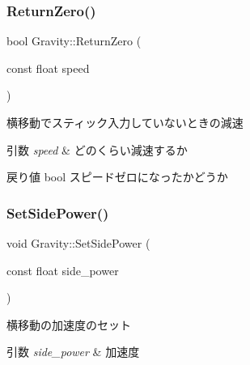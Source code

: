 \mbox{\label{class_gravity_a1efc862b822ca8cfea80b066ed4479f9}} 
\subsubsection{\texorpdfstring{Return\+Zero()}{ReturnZero()}}
{\footnotesize\ttfamily bool Gravity\+::\+Return\+Zero (\begin{DoxyParamCaption}\item[{const float}]{speed }\end{DoxyParamCaption})\hspace{0.3cm}{\ttfamily [inline]}}



横移動でスティック入力していないときの減速 


\begin{DoxyParams}{引数}
{\em speed} & どのくらい減速するか \\
\hline
\end{DoxyParams}
\begin{DoxyReturn}{戻り値}
bool スピードゼロになったかどうか 
\end{DoxyReturn}
\mbox{\label{class_gravity_a76503b3788b696748828f6e48556b9ab}} 
\subsubsection{\texorpdfstring{Set\+Side\+Power()}{SetSidePower()}}
{\footnotesize\ttfamily void Gravity\+::\+Set\+Side\+Power (\begin{DoxyParamCaption}\item[{const float}]{side\+\_\+power }\end{DoxyParamCaption})\hspace{0.3cm}{\ttfamily [inline]}}



横移動の加速度のセット 


\begin{DoxyParams}{引数}
{\em side\+\_\+power} & 加速度 \\
\hline
\end{DoxyParams}
\mbox{\label{class_gravity_af31f3dceee7c82385b4c93569e215f91}} 
